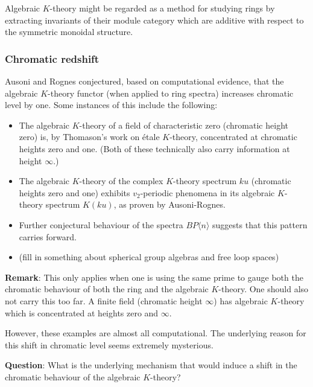 \documentclass[12pt,titlepage]{article}
\theoremstyle{plain}
\theoremstyle{definition}
\theoremstyle{remark}
\begin{document}
Algebraic $K$-theory might be regarded as a method for studying rings by extracting invariants of their module category which are additive with respect to the symmetric monoidal structure.

\hypertarget{chromatic_redshift_2}{}\subsubsection{{Chromatic redshift}}\label{chromatic_redshift_2}

Ausoni and Rognes conjectured, based on computational evidence, that the algebraic $K$-theory functor (when applied to ring spectra) increases chromatic level by one. Some instances of this include the following:

\begin{itemize}%
\item The algebraic $K$-theory of a field of characteristic zero (chromatic height zero) is, by Thomason'{}s work on étale $K$-theory, concentrated at chromatic heights zero and one. (Both of these technically also carry information at height $\infty$.)


\item The algebraic $K$-theory of the complex $K$-theory spectrum $ku$ (chromatic heights zero and one) exhibits $v_2$-periodic phenomena in its algebraic $K$-theory spectrum $K(ku)$, as proven by Ausoni-Rognes.


\item Further conjectural behaviour of the spectra $BP\langle n\rangle$ suggests that this pattern carries forward.


\item (fill in something about spherical group algebras and free loop spaces)



\end{itemize}
\textbf{Remark}: This only applies when one is using the same prime to gauge both the chromatic behaviour of both the ring and the algebraic $K$-theory. One should also not carry this too far. A finite field (chromatic height $\infty$) has algebraic $K$-theory which is concentrated at heights zero and $\infty$.

However, these examples are almost all computational. The underlying reason for this shift in chromatic level seems extremely mysterious.

\textbf{Question}: What is the underlying mechanism that would induce a shift in the chromatic behaviour of the algebraic $K$-theory?
\end{document}
